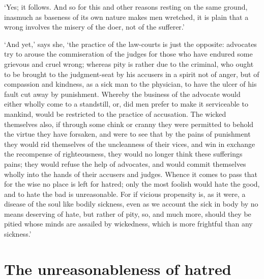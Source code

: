 \documentclass[11pt]{book}
\begin{document}
`Yes; it follows. And so for this and other reasons resting on the same
ground, inasmuch as baseness of its own nature makes men wretched, it is
plain that a wrong involves the misery of the doer, not of the
sufferer.'

`And yet,' says she, `the practice of the law-courts is just the
opposite: advocates try to arouse the commiseration of the judges for
those who have endured some grievous and cruel wrong; whereas pity is
rather due to the criminal, who ought to be brought to the judgment-seat
by his accusers in a spirit not of anger, but of compassion and
kindness, as a sick man to the physician, to have the ulcer of his fault
cut away by punishment. Whereby the business of the advocate would
either whol\-ly come to a standstill, or, did men prefer to make it
serviceable to mankind, would be restricted to the practice of
accusation. The wicked themselves also, if through some chink or cranny
they were permitted to behold the virtue they have forsaken, and were to
see that by the pains of punishment they would rid themselves of the
uncleanness of their vices, and win in exchange the recompense of
righteousness, they would no longer think these sufferings pains; they
would refuse the help of advocates, and would commit themselves whol\-ly
into the hands of their accusers and judges. Whence it comes to pass
that for the wise no place is left for hatred; only the most foolish
would hate the good, and to hate the bad is unreasonable. For if vicious
propensity is, as it were, a disease of the soul like bodily sickness,
even as we account the sick in body by no means deserving of hate, but
rather of pity, so, and much more, should they be pitied whose minds are
assailed by wickedness, which is more frightful than any sickness.'



\section{The unreasonableness of hatred}
\end{document}
